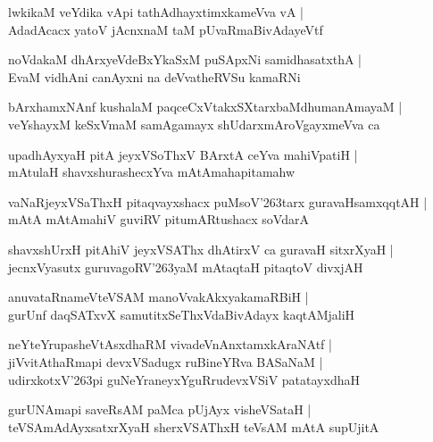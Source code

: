 \documentclass[twoside,12pt,openright]{book}
\def\S{\char'263}
\newcounter{shloka}[chapter]
\begin{document}
\begin{shloka}
lwkikaM veYdika vApi tathAdhayxtimxkameVva vA |\\
AdadAcacx yatoV jAcnxnaM taM pUvaRmaBivAdayeVtf 
\end{shloka}

\begin{shloka}
noVdakaM dhArxyeVdeBxYkaSxM puSApxNi samidhasatxthA |\\
EvaM vidhAni canAyxni na deVvatheRVSu kamaRNi
\end{shloka}

\begin{shloka}
bArxhamxNAnf kushalaM paqceCxVtakxSXtarxbaMdhumanAmayaM |\\
veYshayxM keSxVmaM samAgamayx shUdarxmAroVgayxmeVva ca 
\end{shloka}

\begin{shloka}
upadhAyxyaH pitA jeyxVSoThxV BArxtA ceYva mahiVpatiH |\\
mAtulaH shavxshurashecxYva mAtAmahapitamahw 
\end{shloka}

\begin{shloka}
vaNaRjeyxVSaThxH pitaqvayxshacx puMsoV\S tarx guravaHsamxqqtAH |\\
mAtA mAtAmahiV guviRV pitumARtushacx soVdarA 
\end{shloka}

\begin{shloka}
shavxshUrxH pitAhiV jeyxVSAThx dhAtirxV ca guravaH sitxrXyaH |\\
jecnxVyasutx guruvagoRV\S yaM mAtaqtaH pitaqtoV divxjAH 
\end{shloka}

\begin{shloka}
anuvataRnameVteVSAM manoVvakAkxyakamaRBiH |\\
gurUnf daqSATxvX samutitxSeThxVdaBivAdayx kaqtAMjaliH 
\end{shloka}

\begin{shloka}
neYteYrupasheVtAsxdhaRM vivadeVnAnxtamxkAraNAtf |\\
jiVvitAthaRmapi devxVSadugx ruBineYRva BASaNaM |\\
udirxkotxV\S pi guNeYraneyxYguRrudevxVSiV patatayxdhaH
\end{shloka}

\begin{shloka}
gurUNAmapi saveRsAM paMca pUjAyx visheVSataH |\\
teVSAmAdAyxsatxrXyaH sherxVSAThxH teVsAM mAtA supUjitA 
\end{shloka}
\end{document}

